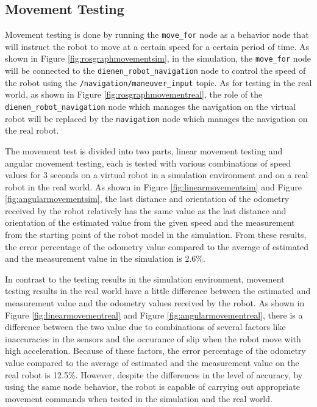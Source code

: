\subsection{Movement Testing}
\label{subsec:movementtesting}




Movement testing is done by running the \lstinline{move_for} node as a behavior node that will instruct the robot to move at a certain speed for a certain period of time.
As shown in Figure \ref{fig:rosgraphmovementsim},
  in the simulation,
  the \lstinline{move_for} node will be connected to the \lstinline{dienen_robot_navigation} node to control the speed of the robot using the \lstinline{/navigation/maneuver_input} topic.
As for testing in the real world, as shown in Figure \ref{fig:rosgraphmovementreal},
  the role of the \lstinline{dienen_robot_navigation} node which manages the navigation on the virtual robot will be replaced by the \lstinline{navigation} node which manages the navigation on the real robot.




The movement test is divided into two parts,
  linear movement testing and angular movement testing,
  each is tested with various combinations of speed values for 3 seconds on a virtual robot in a simulation environment and on a real robot in the real world.
As shown in Figure \ref{fig:linearmovementsim} and Figure \ref{fig:angularmovementsim},
  the last distance and orientation of the odometry received by the robot relatively has the same value as the last distance and orientation of the estimated value from the given speed and the measurement from the starting point of the robot model in the simulation.
From these results, the error percentage of the odometry value compared to the average of estimated and the measurement value in the simulation is 2.6\%.




In contrast to the testing results in the simulation environment,
  movement testing results in the real world have a little difference between the estimated and measurement value and the odometry values received by the robot.
As shown in Figure \ref{fig:linearmovementreal} and Figure \ref{fig:angularmovementreal},
  there is a difference between the two value due to combinations of several factors like inaccuracies in the sensors and the occurance of slip when the robot move with high acceleration.
Because of these factors,
  the error percentage of the odometry value compared to the average of estimated and the measurement value on the real robot is 12.5\%.
However,
  despite the differences in the level of accuracy,
  by using the same node behavior,
  the robot is capable of carrying out appropriate movement commands when tested in the simulation and the real world.
